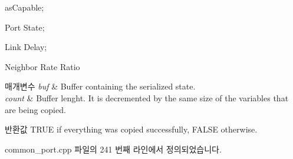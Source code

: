 \begin{DoxyItemize}
\item as\+Capable;
\item Port State;
\item Link Delay;
\item Neighbor Rate Ratio 
\begin{DoxyParams}{매개변수}
{\em buf} & Buffer containing the serialized state. \\
\hline
{\em count} & Buffer lenght. It is decremented by the same size of the variables that are being copied. \\
\hline
\end{DoxyParams}
\begin{DoxyReturn}{반환값}
T\+R\+UE if everything was copied successfully, F\+A\+L\+SE otherwise. 
\end{DoxyReturn}

\end{DoxyItemize}

common\+\_\+port.\+cpp 파일의 241 번째 라인에서 정의되었습니다.


